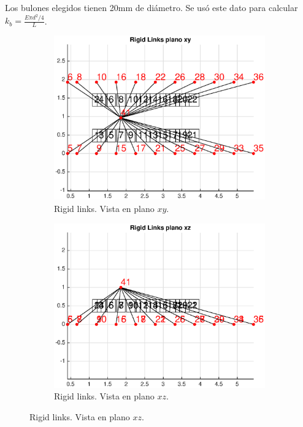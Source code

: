 \documentclass[onecolumn,10pt,titlepage,a4paper]{article}
\begin{document}
Los bulones elegidos tienen 20mm de diámetro. Se usó este dato para calcular $k_b=\frac{E\pi d^2/4}{L}$.


\begin{figure}[htb!]
	\centering
	\begin{subfigure}{0.49\textwidth}
		\includegraphics[width=\linewidth]{fig/modelRLxy.eps}
		\caption{Rigid links. Vista en plano $x\!y$.}
		\label{fig:modeloRLxy}
	\end{subfigure}
	\begin{subfigure}{0.49\textwidth}
		\includegraphics[width=\linewidth]{fig/modelRLxz.eps}
		\caption{Rigid links. Vista en plano $x\!z$.}
		\label{fig:modeloRLxz}
	\end{subfigure}
\end{figure}
\end{document}
